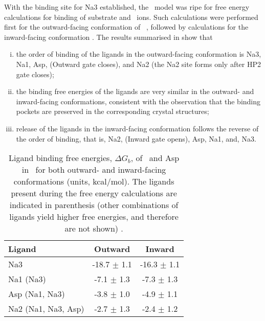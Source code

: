With the binding site for Na3 established, the \GltPh\ model was ripe for
free energy calculations for binding of substrate and \Na\ ions. Such 
calculations were performed first for the outward-facing conformation of 
\GltPh\ \cite{Heinzelmann2011}, followed by calculations for the inward-facing 
conformation \cite{Heinzelmann2013}. The results summarised in 
 show that
\begin{enumerate}[(i)]
    \item the order of binding of the ligands in the outward-facing conformation 
    is Na3, Na1, Asp, (Outward gate closes), and Na2 (the Na2 site forms only 
    after HP2 gate closes);
    \item the binding free energies of the ligands are very similar in the 
    outward- and inward-facing conformations, consistent with the observation 
    that the binding pockets are preserved in the corresponding crystal structures;
    \item release of the ligands in the inward-facing conformation follows the 
    reverse of the order of binding, that is, Na2, (Inward gate opens), Asp, Na1, 
    and, Na3.
\end{enumerate}

\begin{table}[t!]
\caption{Ligand binding free energies, $\Delta G_{b}$, of \Na\ and Asp
in \GltPh\ for both outward- and inward-facing conformations (units, 
kcal/mol). The ligands present during the free energy calculations are 
indicated in parenthesis (other combinations of ligands yield higher free 
energies, and therefore are not shown) \cite{Heinzelmann2011,Heinzelmann2013}.}
\label{review:tab1}
\begin{center}
\begin{tabular}{lcc}
\hline
Ligand & Outward & Inward \\ \hline
Na3 & -18.7 $\pm$ 1.1 & -16.3 $\pm$ 1.1 \\
Na1 (Na3) & -7.1 $\pm$ 1.3 & -7.3 $\pm$ 1.3 \\
Asp (Na1, Na3) & -3.8 $\pm$ 1.0 & -4.9 $\pm$ 1.1 \\
Na2 (Na1, Na3, Asp) & -2.7 $\pm$ 1.3 & -2.4 $\pm$ 1.2 \\ \hline
\end{tabular}
\end{center}
\end{table}

